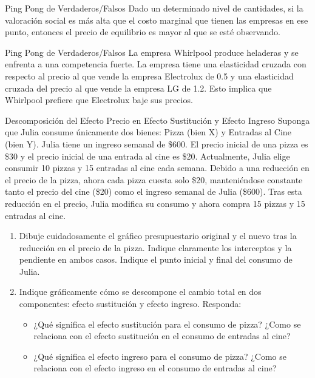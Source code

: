 \documentclass{beamer}
\begin{document}
\begin{frame}{Ping Pong de Verdaderos/Falsos}
    \centering
    Dado un determinado nivel de cantidades, si la valoración social es más alta que el costo marginal que tienen las empresas en ese punto, entonces el precio de equilibrio es mayor al que se esté observando.
\end{frame}

\begin{frame}{Ping Pong de Verdaderos/Falsos}
    \centering
    La empresa Whirlpool produce heladeras y se enfrenta a una competencia fuerte. La empresa tiene una elasticidad cruzada con respecto al precio al que vende la empresa Electrolux de 0.5 y una elasticidad cruzada del precio al que vende la empresa LG de 1.2. Esto implica que Whirlpool prefiere que Electrolux baje sus precios.
\end{frame}

\begin{frame}{Descomposición del Efecto Precio en Efecto Sustitución y Efecto Ingreso}
    \scriptsize
    Suponga que Julia consume únicamente dos bienes: Pizza (bien X) y Entradas al Cine (bien Y). Julia tiene un ingreso semanal de \$600. El precio inicial de una pizza es \$30 y el precio inicial de una entrada al cine es \$20. Actualmente, Julia elige consumir 10 pizzas y 15 entradas al cine cada semana.
    Debido a una reducción en el precio de la pizza, ahora cada pizza cuesta solo \$20, manteniéndose constante tanto el precio del cine (\$20) como el ingreso semanal de Julia (\$600). Tras esta reducción en el precio, Julia modifica su consumo y ahora compra 15 pizzas y 15 entradas al cine.
    \begin{enumerate}
        \item Dibuje cuidadosamente el gráfico presupuestario original y el nuevo tras la reducción en el precio de la pizza. Indique claramente los interceptos y la pendiente en ambos casos. Indique el punto inicial y final del consumo de Julia.
        \item Indique gráficamente cómo se descompone el cambio total en dos componentes: efecto sustitución y efecto ingreso. Responda:
        \begin{itemize}
            \scriptsize
            \item ¿Qué significa el efecto sustitución para el consumo de pizza? ¿Como se relaciona con el efecto sustitución en el consumo de entradas al cine?
            \item ¿Qué significa el efecto ingreso para el consumo de pizza? ¿Como se relaciona con el efecto ingreso en el consumo de entradas al cine?
        \end{itemize}
    \end{enumerate}
\end{frame}
\end{document}
